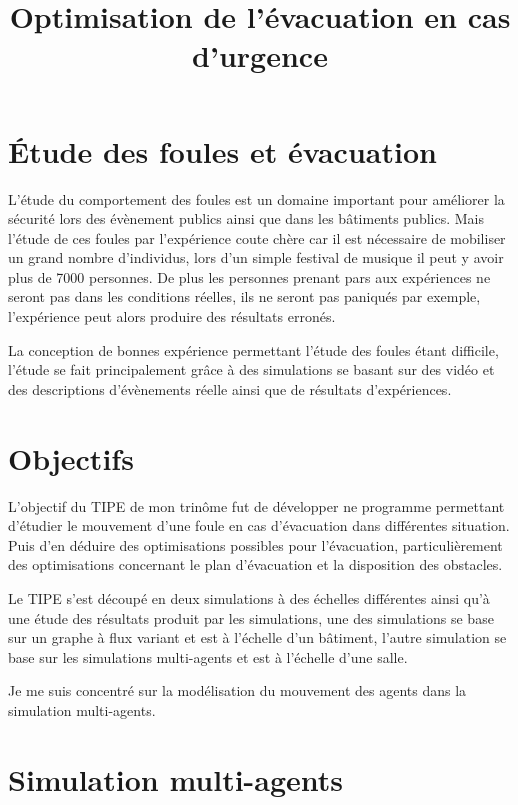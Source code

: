 \documentclass{article}
\title{Optimisation de l'évacuation en cas d'urgence}
\begin{document}
\maketitle

\section{Étude des foules et évacuation}

L'étude du comportement des foules est un domaine important pour
améliorer la sécurité lors des évènement publics ainsi que dans
les bâtiments publics. Mais l'étude de ces foules par l'expérience
coute chère car il est nécessaire de mobiliser un grand nombre d'individus,
lors d'un simple festival de musique il peut y avoir plus de 7000 personnes.
De plus les personnes prenant pars aux expériences ne seront pas
dans les conditions réelles, ils ne seront pas paniqués par exemple,
l'expérience peut alors produire des résultats erronés.

La conception de bonnes expérience permettant l'étude des foules
étant difficile, l'étude se fait principalement grâce
à des simulations se basant sur des vidéo et des descriptions
d'évènements réelle ainsi que de résultats d'expériences.

\section{Objectifs}

L'objectif du TIPE de mon trinôme fut de développer ne programme
permettant d'étudier le mouvement d'une foule en cas d'évacuation
dans différentes situation. Puis d'en déduire des optimisations possibles
pour l'évacuation, particulièrement des optimisations concernant le plan
d'évacuation et la disposition des obstacles.

Le TIPE s'est découpé en deux simulations à des échelles différentes ainsi
qu'à une étude des résultats produit par les simulations, une des simulations
se base sur un graphe à flux variant et 
est à l'échelle d'un bâtiment, l'autre simulation se base sur les simulations
multi-agents et est à l'échelle d'une salle.

Je me suis concentré sur la modélisation du mouvement des agents dans la
simulation multi-agents.

\section{Simulation multi-agents}
\end{document}
